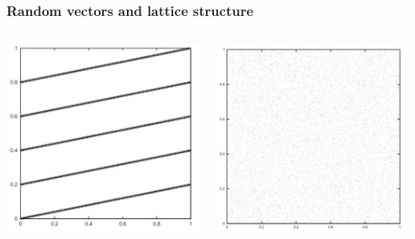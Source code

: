 \documentclass[10pt, serif, mathserif]{beamer}
\begin{document}
\begin{frame}
  \frametitle{Random vectors and lattice structure}
  \begin{columns}
    \begin{column}{.5\textwidth}
      \centering \includegraphics[width=\textwidth]{images/claudia2.png}
    \end{column}
    \begin{column}{.5\textwidth}
      \centering \includegraphics[width=\textwidth]{images/claudia3.png}
    \end{column}
  \end{columns}
\end{frame}
\end{document}
